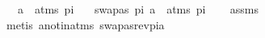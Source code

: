 \begin{isabellebody}
\ \ \ {\isachardoublequoteopen}a\ {\isasymin}\ atms\ pi{\isachardoublequoteclose}\ \isanewline
\ \ swapas\ pi\ a\ {\isasymin}\ atms\ pi{\isachardoublequoteclose}\isanewline
%
\isadelimproof
\ \ %
\endisadelimproof
%
\isatagproof
{}\isamarkupfalse%
\ assms\ \isamarkupfalse%
\ {\isacharparenleft}{\kern0pt}metis\ a{\isacharunderscore}{\kern0pt}not{\isacharunderscore}{\kern0pt}in{\isacharunderscore}{\kern0pt}atms\ swapas{\isacharunderscore}{\kern0pt}rev{\isacharunderscore}{\kern0pt}pi{\isacharunderscore}{\kern0pt}a{\isacharparenright}{\kern0pt}%
\endisatagproof
{\isafoldproof}%
%
\isadelimproof
\isanewline
%
\endisadelimproof
%
\isadelimtheory
%
\endisadelimtheory
%
\isatagtheory
%
\endisatagtheory
{\isafoldtheory}%
%
\isadelimtheory
%
\endisadelimtheory
%
\end{isabellebody}%
\endinput
